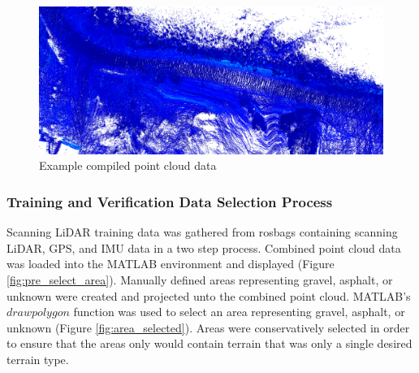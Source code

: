 \documentclass[numbered,pdftex]{ohio-etd}
\begin{document}
{{{{				\begin{figure}[H]
					\centering
					\includegraphics[width=0.7\linewidth]{Defense_Images/pc_example}
					\caption[Compiled Point Cloud Data]{Example compiled point cloud data}
					\label{fig:Compiled_PCD}
				\end{figure}
			
			} %
	
			\subsubsection{Training and Verification Data Selection Process}\label{sec:training_and_verification_data_selection_process}{

				{Scanning LiDAR training data was gathered from rosbags containing scanning LiDAR, GPS, and IMU data in a two step process. Combined point cloud data was loaded into the MATLAB environment and displayed (Figure \ref{fig:pre_select_area}). Manually defined areas representing gravel, asphalt, or unknown were created and projected unto the combined point cloud. MATLAB's $drawpolygon$ function was used to select an area representing gravel, asphalt, or unknown (Figure \ref{fig:area_selected}). Areas were conservatively selected in order to ensure that the areas only would contain terrain that was only a single desired terrain type. }
	
}}}}
\end{document}
